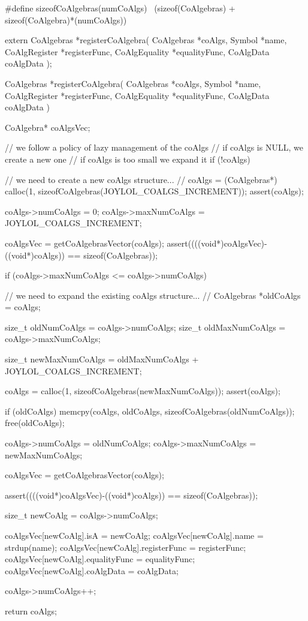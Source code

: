 #define sizeofCoAlgebras(numCoAlgs) \
  (sizeof(CoAlgebras) + sizeof(CoAlgebra)*(numCoAlgs))
  
extern CoAlgebras *registerCoAlgebra(
  CoAlgebras *coAlgs,
  Symbol *name,
  CoAlgRegister *registerFunc,
  CoAlgEquality *equalityFunc,
  CoAlgData     coAlgData
);
\stopCHeader

\startCCode
CoAlgebras *registerCoAlgebra(
  CoAlgebras *coAlgs,
  Symbol *name,
  CoAlgRegister *registerFunc,
  CoAlgEquality *equalityFunc,
  CoAlgData     coAlgData
) {
  CoAlgebra* coAlgsVec;

  // we follow a policy of lazy management of the coAlgs
  // if coAlgs is NULL, we create a new one
  // if coAlgs is too small we expand it
  if (!coAlgs) {
    // we need to create a new coAlgs structure...
    //
    coAlgs = (CoAlgebras*)
      calloc(1, sizeofCoAlgebras(JOYLOL_COALGS_INCREMENT));
    assert(coAlgs);
    
    coAlgs->numCoAlgs    = 0;
    coAlgs->maxNumCoAlgs = JOYLOL_COALGS_INCREMENT;
  }
  coAlgsVec = getCoAlgebrasVector(coAlgs);
  assert((((void*)coAlgsVec)-((void*)coAlgs)) == sizeof(CoAlgebras));

  if (coAlgs->maxNumCoAlgs <= coAlgs->numCoAlgs) {
    // we need to expand the existing coAlgs structure...
    //  
    CoAlgebras *oldCoAlgs  = coAlgs;
    
    size_t oldNumCoAlgs    = coAlgs->numCoAlgs;
    size_t oldMaxNumCoAlgs = coAlgs->maxNumCoAlgs;
    
    size_t newMaxNumCoAlgs =
      oldMaxNumCoAlgs + JOYLOL_COALGS_INCREMENT;

    coAlgs = calloc(1, sizeofCoAlgebras(newMaxNumCoAlgs));
    assert(coAlgs);
    
    if (oldCoAlgs) {
      memcpy(coAlgs, oldCoAlgs,
        sizeofCoAlgebras(oldNumCoAlgs));
      free(oldCoAlgs);
    }
    
    coAlgs->numCoAlgs    = oldNumCoAlgs;
    coAlgs->maxNumCoAlgs = newMaxNumCoAlgs;

    coAlgsVec = getCoAlgebrasVector(coAlgs);
  }
  assert((((void*)coAlgsVec)-((void*)coAlgs)) == sizeof(CoAlgebras));
  
  size_t newCoAlg = coAlgs->numCoAlgs;
  
  coAlgsVec[newCoAlg].isA           = newCoAlg;
  coAlgsVec[newCoAlg].name          = strdup(name);
  coAlgsVec[newCoAlg].registerFunc  = registerFunc;
  coAlgsVec[newCoAlg].equalityFunc  = equalityFunc;
  coAlgsVec[newCoAlg].coAlgData     = coAlgData;
  
  coAlgs->numCoAlgs++;
  
  return coAlgs;
}
\stopCCode

